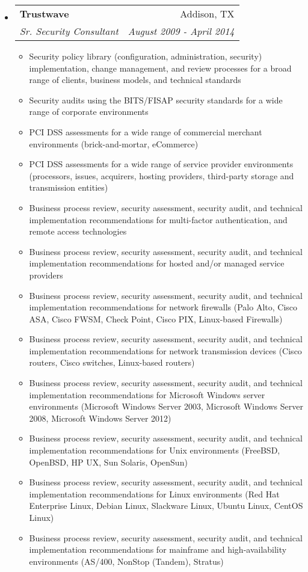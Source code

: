 \documentclass[letterpaper,11pt]{article}
\makeatletter
\newcommand{\resitem}[1]{\item #1 \vspace{-2pt}}
\newcommand{\ressubheading}[4]{
\begin{tabular*}{6.5in}{l@{\cftdotfill{\cftsecdotsep}\extracolsep{\fill}}r}
		\textbf{#1} & #2 \\
		\textit{#3} & \textit{#4} \\
\end{tabular*}\vspace{-6pt}}
\makeatother
\begin{document}
\begin{itemize}
\item
	\ressubheading{Trustwave}{Addison, TX}{Sr. Security Consultant}{August 2009 - April 2014}
	\begin{itemize}
            \resitem{Security policy library (configuration, administration, security) implementation, change management, and review processes for a broad range of clients, business models, and technical standards}
            \resitem{Security audits using the BITS/FISAP security standards for a wide range of corporate environments}
            \resitem{PCI DSS assessments for a wide range of commercial merchant environments (brick-and-mortar, eCommerce)}
            \resitem{PCI DSS assessments for a wide range of service provider environments (processors, issues, acquirers, hosting providers, third-party storage and transmission entities)}
            \resitem{Business process review, security assessment, security audit, and technical implementation recommendations for multi-factor authentication, and remote access technologies}
            \resitem{Business process review, security assessment, security audit, and technical implementation recommendations for hosted and/or managed service providers}
            \resitem{Business process review, security assessment, security audit, and technical implementation recommendations for network firewalls (Palo Alto, Cisco ASA, Cisco FWSM, Check Point, Cisco PIX, Linux-based Firewalls)}
            \resitem{Business process review, security assessment, security audit, and technical implementation recommendations for network transmission devices (Cisco routers, Cisco switches, Linux-based routers)}
            \resitem{Business process review, security assessment, security audit, and technical implementation recommendations for Microsoft Windows server environments (Microsoft Windows Server 2003, Microsoft Windows Server 2008, Microsoft Windows Server 2012)}
            \resitem{Business process review, security assessment, security audit, and technical implementation recommendations for Unix environments (FreeBSD, OpenBSD, HP UX, Sun Solaris, OpenSun)}
            \resitem{Business process review, security assessment, security audit, and technical implementation recommendations for Linux environments (Red Hat Enterprise Linux, Debian Linux, Slackware Linux, Ubuntu Linux, CentOS Linux)}
            \resitem{Business process review, security assessment, security audit, and technical implementation recommendations for mainframe and high-availability environments (AS/400, NonStop (Tandem), Stratus)}
	\end{itemize}


\end{itemize}
\end{document}
